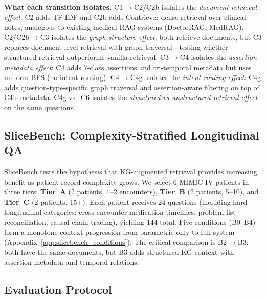 \begin{sloppypar}
\noindent\textbf{What each transition isolates.}
C1$\to$C2/C2b isolates the \emph{document retrieval effect}: C2 adds TF-IDF and C2b adds Contriever dense retrieval over clinical notes, analogous to existing medical RAG systems (DoctorRAG, MedRAG).
C2/C2b$\to$C3 isolates the \emph{graph structure effect}: both retrieve documents, but C3 replaces document-level retrieval with graph traversal---testing whether structured retrieval outperforms vanilla retrieval.
C3$\to$C4 isolates the \emph{assertion metadata effect}: C4 adds 7-class assertions and tri-temporal metadata but uses uniform BFS (no intent routing).
C4$\to$C4g isolates the \emph{intent routing effect}: C4g adds question-type-specific graph traversal and assertion-aware filtering on top of C4's metadata.
C4g vs.\ C6 isolates the \emph{structured-vs-unstructured retrieval effect} on the same questions.
\end{sloppypar}


\subsection{SliceBench: Complexity-Stratified Longitudinal QA}
\label{sec:bench:slicebench}

SliceBench tests the hypothesis that KG-augmented retrieval provides increasing benefit as patient record complexity grows.
We select 6 MIMIC-IV patients in three tiers: \textbf{Tier~A} (2 patients, 1--2 encounters), \textbf{Tier~B} (2 patients, 5--10), and \textbf{Tier~C} (2 patients, 15+).
Each patient receives 24 questions (including hard longitudinal categories: cross-encounter medication timelines, problem list reconciliation, causal chain tracing), yielding 144 total.
Five conditions (B0--B4) form a monotone context progression from parametric-only to full system (Appendix~\ref{app:slicebench_conditions}).
The critical comparison is B2$\to$B3: both have the same documents, but B3 adds structured KG context with assertion metadata and temporal relations.

\subsection{Evaluation Protocol}
\label{sec:bench:protocol}

